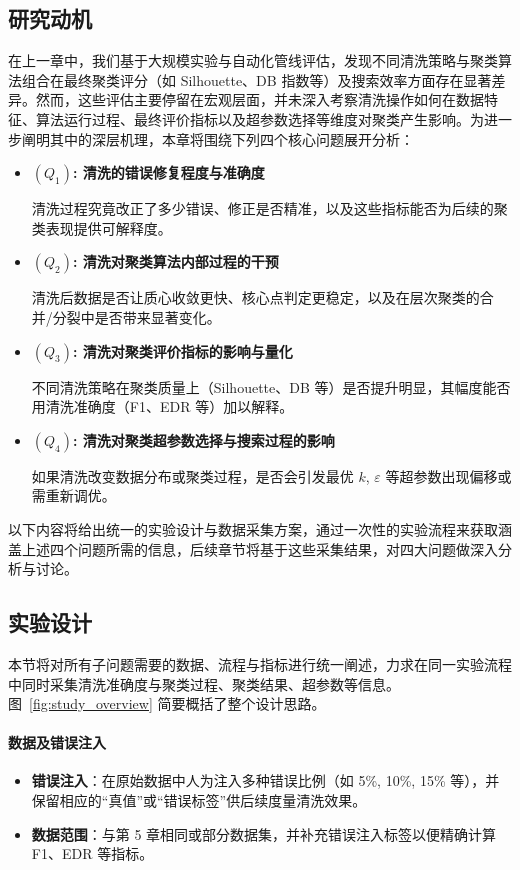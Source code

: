 \documentclass[10pt]{article} %
\numberwithin{equation}{section}
\begin{document}
\subsection{研究动机}
\label{sec:motivation}

在上一章中，我们基于大规模实验与自动化管线评估，发现不同清洗策略与聚类算法组合在最终聚类评分（如 Silhouette、DB 指数等）及搜索效率方面存在显著差异。然而，这些评估主要停留在宏观层面，并未深入考察清洗操作如何在数据特征、算法运行过程、最终评价指标以及超参数选择等维度对聚类产生影响。为进一步阐明其中的深层机理，本章将围绕下列四个核心问题展开分析：

\begin{itemize}
    \item \textbf{\((Q_1)\): 清洗的错误修复程度与准确度}
    
    清洗过程究竟改正了多少错误、修正是否精准，以及这些指标能否为后续的聚类表现提供可解释度。
    
    \item \textbf{\((Q_2)\): 清洗对聚类算法内部过程的干预}

    清洗后数据是否让质心收敛更快、核心点判定更稳定，以及在层次聚类的合并/分裂中是否带来显著变化。

    \item \textbf{\((Q_3)\): 清洗对聚类评价指标的影响与量化}

    不同清洗策略在聚类质量上（Silhouette、DB 等）是否提升明显，其幅度能否用清洗准确度（F1、EDR 等）加以解释。

    \item \textbf{\((Q_4)\): 清洗对聚类超参数选择与搜索过程的影响}

    如果清洗改变数据分布或聚类过程，是否会引发最优 $k$, $\varepsilon$ 等超参数出现偏移或需重新调优。
\end{itemize}

\noindent
以下内容将给出统一的实验设计与数据采集方案，通过一次性的实验流程来获取涵盖上述四个问题所需的信息，后续章节将基于这些采集结果，对四大问题做深入分析与讨论。

\subsection{实验设计}
\label{sec:exp_design}

本节将对所有子问题需要的数据、流程与指标进行统一阐述，力求在同一实验流程中同时采集清洗准确度与聚类过程、聚类结果、超参数等信息。图~\ref{fig:study_overview} 简要概括了整个设计思路。

\paragraph{数据及错误注入}
\begin{itemize}
    \item \textbf{错误注入}：在原始数据中人为注入多种错误比例（如 5\%, 10\%, 15\% 等），并保留相应的“真值”或“错误标签”供后续度量清洗效果。
    \item \textbf{数据范围}：与第 5 章相同或部分数据集，并补充错误注入标签以便精确计算 F1、EDR 等指标。
\end{itemize}
\end{document}
